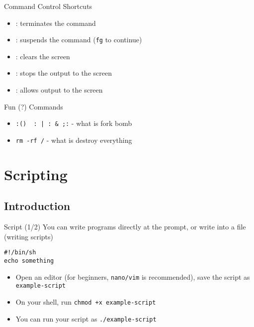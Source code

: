 \documentclass[12pt]{beamer}
\begin{document}
\begin{frame}{Command Control Shortcuts}
  \begin{itemize}
    \item {}: terminates the command
    \item {}: suspends the command (\texttt{fg} to continue)
    \item {}: clears the screen
    \item {}: stops the output to the screen
    \item {}: allows output to the screen
  \end{itemize}
\end{frame}

\begin{frame}{Fun (?) Commands}
    \begin{itemize}
        \item \texttt{:() { : | : & };:} - what is fork bomb
        \item \texttt{rm -rf /} - what is destroy everything
    \end{itemize}
\end{frame}
\section{Scripting}
\subsection{Introduction}

\begin{frame}[fragile]{Script (1/2)}
  You can write programs directly at the prompt, or write into a file (writing scripts)
  \begin{verbatim}
#!/bin/sh
echo something
\end{verbatim}
  \begin{itemize}
    \item Open an editor (for beginners, \texttt{nano/vim} is recommended), save the script as \texttt{example-script}
    \item On your shell, run \texttt{chmod +x example-script}
    \item You can run your script as \texttt{./example-script}
  \end{itemize}
\end{frame}
\end{document}
